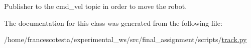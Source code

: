 Publisher to the cmd\+\_\+vel topic in order to move the robot. 



The documentation for this class was generated from the following file\+:\begin{DoxyCompactItemize}
\item 
/home/francescotesta/experimental\+\_\+ws/src/final\+\_\+assignment/scripts/\hyperlink{track_8py}{track.\+py}\end{DoxyCompactItemize}
